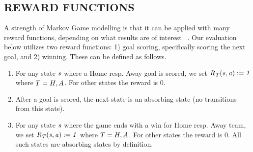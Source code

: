 \subsection{REWARD FUNCTIONS}
\label{subsec:reward}

A strength of Markov Game modelling is that it can be applied with many reward functions, depending on what results are of interest ~\citep{Routley2015a}.
Our evaluation below utilizes two reward functions: 1) goal scoring, specifically scoring the next goal, and 2) winning. These can be defined as follows. 


\begin{enumerate}
\item For any state $s$ where a Home resp. Away goal is scored, we set $\it{R}_{T}(s,a) := 1$ where $T = H,A$. For other states the reward is 0. 
\item After a goal is scored, the next state is an absorbing state (no transitions from this state).
\item For any state $s$ where the game ends with a win for Home resp. Away team, we set $\it{R}_{T}(s,a) := 1$ where $T = H,A$. For other states the reward is 0. All such states are absorbing states by definition.
\end{enumerate}
%

